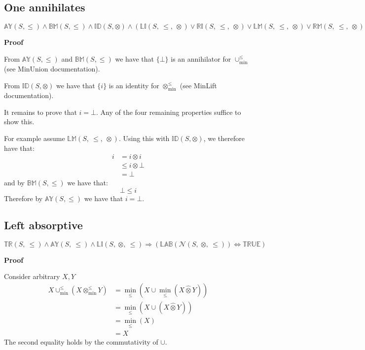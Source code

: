 \documentclass[10pt]{article}
\newcommand{\propname}[1]{{\mathbb{#1}}}
\newcommand{\minlift}{\otimes_{\min}^{\leq}}
\newcommand{\lift}{\hat{\otimes}}
\newcommand{\minunion}{\cup_{\min}^{\leq}}
\newcommand{\proof}{\vspace{1em} \textbf{Proof} \vspace{1em}}
\begin{document}
\subsection{One annihilates}

$\propname{AY}(S,\leq) \wedge \propname{BM}(S,\leq) \wedge \propname{ID}(S,\otimes) \wedge (\propname{LI}(S,\ \leq,\ \otimes) \vee \propname{RI}(S,\ \leq,\ \otimes) \vee \propname{LM}(S,\ \leq,\ \otimes) \vee \propname{RM}(S,\ \leq,\ \otimes)) \Rightarrow (\propname{OA}(\mathcal{N}(S,\ \otimes,\ \leq)) \Leftrightarrow \propname{TRUE})$

\proof

From $\propname{AY}(S,\leq)$ and $\propname{BM}(S,\leq)$ we have that $\{ \bot \}$ is an annihilator for $\minunion$ (see MinUnion documentation).

\vspace{0.5em}

From $\propname{ID}(S,\otimes)$ we have that $\{ i \}$ is an identity for $\minlift$ (see MinLift documentation).

\vspace{0.5em}

It remains to prove that $i = \bot$. Any of the four remaining properties suffice to show this. 

\vspace{0.5em}

For example assume $\propname{LM}(S,\ \leq,\ \otimes)$. Using this with $\propname{ID}(S,\otimes)$, we therefore have that:
\begin{align*}
i 	& = i \otimes i \\
  	& \leq i \otimes \bot \\
  	& = \bot
\end{align*} 
and by $\propname{BM}(S,\leq)$ we have that:
\begin{equation*}
\bot \leq i
\end{equation*}
Therefore by $\propname{AY}(S,\leq)$ we have that $i = \bot$.

\subsection{Left absorptive}

$\propname{TR}(S,\ \leq) \wedge \propname{AY}(S,\ \leq) \wedge \propname{LI}(S,\ \otimes,\ \leq) \Rightarrow (\propname{LAB}(\mathcal{N}(S,\ \otimes,\ \leq)) \Leftrightarrow \propname{TRUE})$

\proof

Consider arbitrary $X, Y$
\begin{align*}
X \minunion (X \minlift Y) 	& = \min_\leq(X \cup \min_\leq(X \lift Y)) \\
							& = \min_\leq(X \cup (X \lift Y)) \\
							& = \min_\leq(X) \\
							& = X
\end{align*}
The second equality holds by the commutativity of $\cup$.
\end{document}
